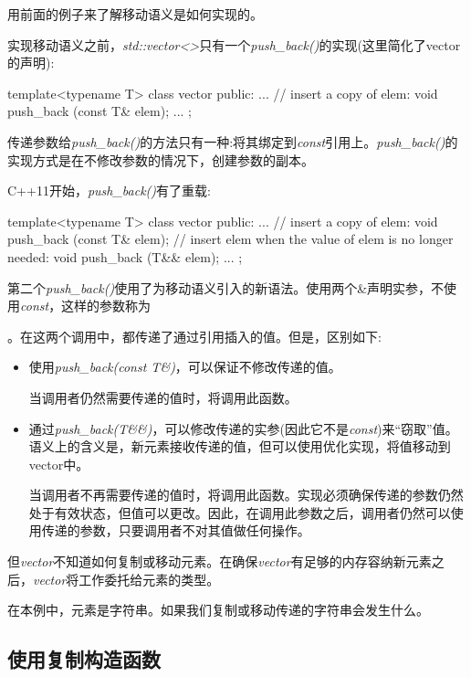 用前面的例子来了解移动语义是如何实现的。

实现移动语义之前，\textit{std::vector<>}只有一个\textit{push_back()}的实现(这里简化了vector的声明):

\begin{cppcode}
template<typename T>
class vector {
	public:
	...
	// insert a copy of elem:
	void push_back (const T& elem);
	...
};
\end{cppcode}

传递参数给\textit{push_back()}的方法只有一种:将其绑定到\textit{const}引用上。\textit{push_back()}的实现方式是在不修改参数的情况下，创建参数的副本。

C++11开始，\textit{push_back()}有了重载:

\begin{cppcode}
template<typename T>
class vector {
	public:
	...
	// insert a copy of elem:
	void push_back (const T& elem);
	// insert elem when the value of elem is no longer needed:
	void push_back (T&& elem);
	...
};
\end{cppcode}

第二个\textit{push_back()}使用了为移动语义引入的新语法。使用两个\&声明实参，不使用\textit{const}，这样的参数称为\begin{cppcode}
右值引用}}。只有一个\&的“普通引用”现在称为\textit{\textbf{左值引用
\end{cppcode}。在这两个调用中，都传递了通过引用插入的值。但是，区别如下:

\begin{itemize}
	\item 使用\textit{push_back(const T\&)}，可以保证不修改传递的值。

	当调用者仍然需要传递的值时，将调用此函数。
	\item 通过\textit{push_back(T\&\&)}，可以修改传递的实参(因此它不是\textit{const})来“窃取”值。语义上的含义是，新元素接收传递的值，但可以使用优化实现，将值移动到vector中。

	当调用者不再需要传递的值时，将调用此函数。实现必须确保传递的参数仍然处于有效状态，但值可以更改。因此，在调用此参数之后，调用者仍然可以使用传递的参数，只要调用者不对其值做任何操作。
\end{itemize}

但\textit{vector}不知道如何复制或移动元素。在确保\textit{vector}有足够的内存容纳新元素之后，\textit{vector}将工作委托给元素的类型。

在本例中，元素是字符串。如果我们复制或移动传递的字符串会发生什么。

\subsection{使用复制构造函数}

